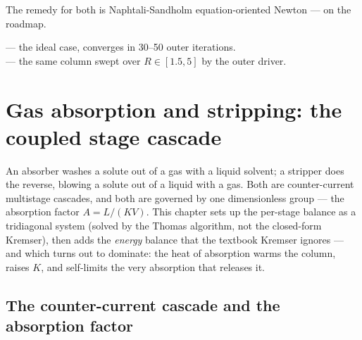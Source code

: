 \documentclass[11pt,a4paper]{article}
\begin{document}
The remedy for both is Naphtali-Sandholm equation-oriented Newton
\cite{NS} --- on the roadmap.

\begin{tutoriallink}
 --- the ideal case, converges
in 30--50 outer iterations. \\
 --- the same column swept
over $R \in [1.5, 5]$ by the outer driver.
\end{tutoriallink}

\section{Gas absorption and stripping: the coupled stage
cascade}\label{ch:absorber}

\begin{whatyoulllearn}
An absorber washes a solute out of a gas with a liquid solvent; a
stripper does the reverse, blowing a solute out of a liquid with a gas.
Both are counter-current multistage cascades, and both are governed by
one dimensionless group --- the absorption factor $A=L/(KV)$.  This
chapter sets up the per-stage balance as a tridiagonal system (solved
by the Thomas algorithm, not the closed-form Kremser), then adds the
\emph{energy} balance that the textbook Kremser ignores --- and which
turns out to dominate: the heat of absorption warms the column, raises
$K$, and self-limits the very absorption that releases it.
\end{whatyoulllearn}

\subsection{The counter-current cascade and the absorption factor}
\end{document}

